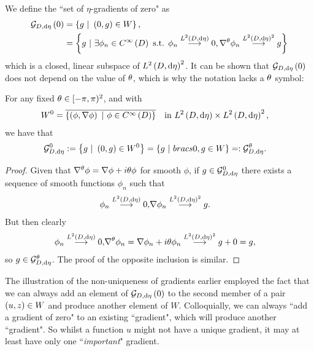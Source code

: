 We define the ``set of $\eta$-gradients of zero" as
\begin{align} \label{eq:GradZeroDef}
	\mathcal{G}_{ D, \mathrm{d}\eta}\left( 0 \right) &= \left\{  g \ \vert \ \left( 0,g \right)\in W \right\}, \\
	&= \left\{  g \ \vert \ \exists\phi_n\in C^{\infty}\left( D \right) \text{ s.t. } \phi_n\overset{L^{2}\left( D,\mathrm{d}\eta \right)}{\longrightarrow}0, \nabla^{\theta}\phi_n\overset{L^{2}\left( D,\mathrm{d}\eta \right)^2}{\longrightarrow}g  \right\}
\end{align}
which is a closed, linear subspace of $L^{2}\left( D,\mathrm{d}\eta \right)^2$. 
It can be shown that $\mathcal{G}_{ D, \mathrm{d}\eta}\left( 0 \right)$ does not depend on the value of $\theta$, which is why the notation lacks a $\theta$ symbol:
\begin{prop} \label{prop:GradZeroInvarientUnderQM}
	For any fixed $\theta\in[-\pi,\pi)^2$, and with
	\begin{align*}
		W^0 &= \overline{\clbracs{\bracs{\phi,\grad\phi} \ \vert \ \phi\in\smooth{D}}} \quad \text{in} \ \ltwo{D}{\eta}\times\ltwo{D}{\eta}^2,
	\end{align*}	
	we have that
	\begin{align*}
		\mathcal{G}^0_{D, \md \eta} := \clbracs{ g \ \vert \ \bracs{0,g}\in W^0} &= 
		\clbracs{ g \ \vert \ bracs{0,g}\in W} =: \mathcal{G}^{\qm}_{D, \md \eta}.
	\end{align*}
\end{prop}
\begin{proof}
	Given that $\nabla^{\theta}\phi = \nabla\phi + i\theta\phi$ for smooth $\phi$, if $g\in\mathcal{G}^0_{D, \mathrm{d} \eta}$ there exists a sequence of smooth functions $\phi_n$ such that 
	\begin{align*}
		\phi_n\overset{L^{2}\left( D,\mathrm{d}\eta \right)}{\longrightarrow}0, &\nabla\phi_n\overset{L^{2}\left( D,\mathrm{d}\eta \right)^2}{\longrightarrow}g.
	\end{align*}
	But then clearly
	\begin{align*}
		\phi_n\overset{L^{2}\left( D,\mathrm{d}\eta \right)}{\longrightarrow}0, &\nabla^{\theta}\phi_n = \nabla\phi_n + i\theta\phi_n \overset{L^{2}\left( D,\mathrm{d}\eta \right)^2}{\longrightarrow} g + 0 = g,
	\end{align*}
	so $g\in\mathcal{G}^\theta_{D, \mathrm{d} \eta}$.
	The proof of the opposite inclusion is similar.
\end{proof}
The illustration of the non-uniqueness of gradients earlier employed the fact that we can always add an element of $\mathcal{G}_{ D, \mathrm{d}\eta}\left( 0 \right)$ to the second member of a pair $\left( u,z \right)\in W$ and produce another element of $W$.
Colloquially, we can always ``add a gradient of zero" to an existing ``gradient", which will produce another ``gradient".
So whilst a function $u$ might not have a unique gradient, it may at least have only one ``\emph{important}" gradient. \newline


